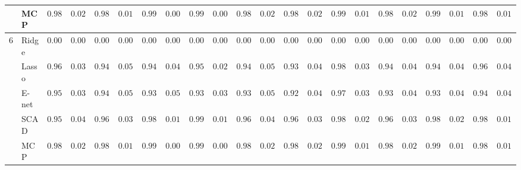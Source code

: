 \begin{tabular}{p{0.2cm}p{1cm}|p{0.6cm}p{0.6cm}|p{0.6cm}p{0.6cm}p{0.6cm}p{0.6cm}p{0.6cm}p{0.6cm}|p{0.6cm}p{0.6cm}p{0.6cm}p{0.6cm}p{0.6cm}p{0.6cm}|p{0.6cm}p{0.6cm}p{0.6cm}p{0.6cm}p{0.6cm}p{0.6cm}}
 & MCP  & $0.9836$ & $0.0208$ & $0.9873$ & $0.0162$ & $0.9952$ & $0.0080$ & $0.9970$ & $0.0063$ & $0.9843$ & $0.0230$ & $0.9869$ & $0.0211$ & $0.9925$ & $0.0122$ & $0.9836$ & $0.0204$ & $0.9931$ & $0.0114$ & $0.9897$ & $0.0105$ \\\hline
6 & Ridge  & $0.0000$ & $0.0000$ & $0.0000$ & $0.0000$ & $0.0000$ & $0.0000$ & $0.0000$ & $0.0000$ & $0.0000$ & $0.0000$ & $0.0000$ & $0.0000$ & $0.0000$ & $0.0000$ & $0.0000$ & $0.0000$ & $0.0000$ & $0.0000$ & $0.0000$ & $0.0000$ \\
 & Lasso  & $0.9611$ & $0.0382$ & $0.9495$ & $0.0561$ & $0.9416$ & $0.0491$ & $0.9568$ & $0.0297$ & $0.9464$ & $0.0594$ & $0.9384$ & $0.0483$ & $0.9803$ & $0.0391$ & $0.9490$ & $0.0468$ & $0.9424$ & $0.0415$ & $0.9628$ & $0.0429$ \\
 & E-net  & $0.9525$ & $0.0386$ & $0.9406$ & $0.0543$ & $0.9308$ & $0.0512$ & $0.9385$ & $0.0304$ & $0.9369$ & $0.0585$ & $0.9289$ & $0.0471$ & $0.9729$ & $0.0365$ & $0.9383$ & $0.0485$ & $0.9305$ & $0.0459$ & $0.9484$ & $0.0409$ \\
 & SCAD  & $0.9559$ & $0.0458$ & $0.9659$ & $0.0342$ & $0.9845$ & $0.0182$ & $0.9962$ & $0.0117$ & $0.9649$ & $0.0405$ & $0.9679$ & $0.0372$ & $0.9838$ & $0.0216$ & $0.9642$ & $0.0329$ & $0.9825$ & $0.0245$ & $0.9850$ & $0.0145$ \\
 & MCP  & $0.9836$ & $0.0208$ & $0.9873$ & $0.0162$ & $0.9952$ & $0.0080$ & $0.9970$ & $0.0063$ & $0.9843$ & $0.0230$ & $0.9869$ & $0.0211$ & $0.9925$ & $0.0122$ & $0.9836$ & $0.0204$ & $0.9931$ & $0.0114$ & $0.9897$ & $0.0105$ \\
\hline 
\end{tabular}

